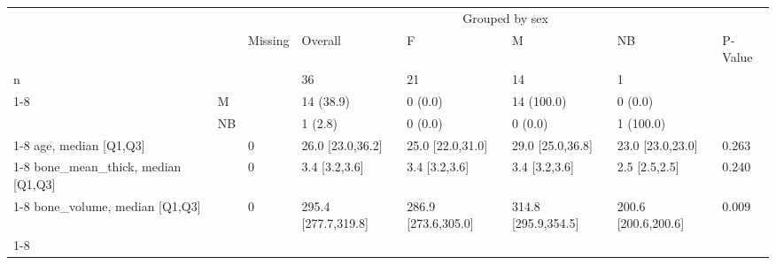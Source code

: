 \begin{tabular}{llllllll}
\toprule
 &  & \multicolumn{6}{c}{Grouped by sex} \\
 &  & Missing & Overall & F & M & NB & P-Value \\
\midrule
n &  &  & 36 & 21 & 14 & 1 &  \\
\cline{1-8}
\multirow[t]{3}{*}{sex, n (%
 & M &  & 14 (38.9) & 0 (0.0) & 14 (100.0) & 0 (0.0) &  \\
 & NB &  & 1 (2.8) & 0 (0.0) & 0 (0.0) & 1 (100.0) &  \\
\cline{1-8}
age, median [Q1,Q3] &  & 0 & 26.0 [23.0,36.2] & 25.0 [22.0,31.0] & 29.0 [25.0,36.8] & 23.0 [23.0,23.0] & 0.263 \\
\cline{1-8}
bone_mean_thick, median [Q1,Q3] &  & 0 & 3.4 [3.2,3.6] & 3.4 [3.2,3.6] & 3.4 [3.2,3.6] & 2.5 [2.5,2.5] & 0.240 \\
\cline{1-8}
bone_volume, median [Q1,Q3] &  & 0 & 295.4 [277.7,319.8] & 286.9 [273.6,305.0] & 314.8 [295.9,354.5] & 200.6 [200.6,200.6] & 0.009 \\
\cline{1-8}
\bottomrule
\end{tabular}
